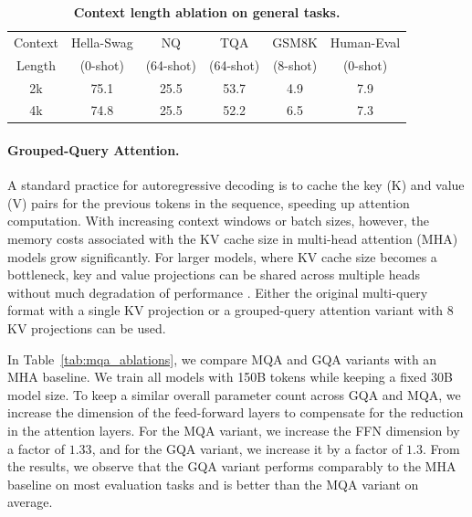 \begin{table}[b!]
   \small
   \centering
   \setlength{\tabcolsep}{3pt}
   \begin{tabular}{cccccc}
   \toprule
   Context & Hella-\newline Swag & NQ & TQA & GSM8K & Human-\newline Eval \\
   Length & (0-shot) & (64-shot) & (64-shot) & (8-shot)  & (0-shot)  \\
   \midrule
   \midrule
   2k & 75.1 & 25.5 & 53.7 & 4.9 & 7.9 \\
   4k & 74.8 & 25.5 & 52.2 & 6.5 & 7.3 \\
   \bottomrule
   \end{tabular}
   \caption{
   \textbf{Context length ablation on general tasks.}
   \label{tab:long_context_ablations_gen}
   }
 \end{table}

\paragraph{Grouped-Query Attention.}
A standard practice for autoregressive decoding is to cache the key (K) and value (V) pairs for the previous tokens in the sequence, speeding up attention computation. With increasing context windows or batch sizes, however, the memory costs associated with the KV cache size in multi-head attention (MHA) models grow significantly. For larger models, where KV cache size becomes a bottleneck, key and value projections can be shared across multiple heads without much degradation of performance \citep{palm1}. Either the original multi-query format with a single KV projection \citep[MQA,~][]{shazeer2019mq} or a grouped-query attention variant with 8 KV projections \citep[GQA,~][]{gqa2023} can be used.

In Table~\ref{tab:mqa_ablations}, we compare MQA and GQA variants with an MHA baseline. We train all models with 150B tokens while keeping a fixed 30B model size. 
To keep a similar overall parameter count across GQA and MQA, we increase the dimension of the feed-forward layers to compensate for the reduction in the attention layers. For the MQA variant, we increase the FFN dimension by a factor of $1.33$, and for the GQA variant, we increase it by a factor of $1.3$. From the results, we observe that the GQA variant performs comparably to the MHA baseline on most evaluation tasks and is better than the MQA variant on average.

